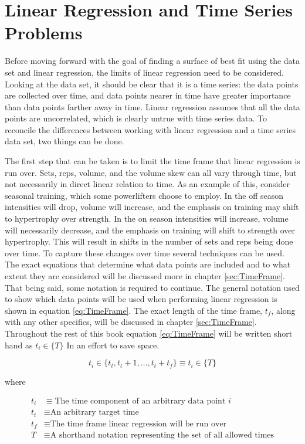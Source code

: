 \section{Linear Regression and Time Series Problems}
\label{sec:PotentialSurfaceLinearRegressionAndTimeSeriesProblems}

Before moving forward with the goal of finding a surface of best fit using the data set and linear regression, the limits of linear regression need to be considered. Looking at the data set, it should be clear that it is a time series: the data points are collected over time, and data points nearer in time have greater importance than data points farther away in time. Linear regression assumes that all the data points are uncorrelated, which is clearly untrue with time series data. To reconcile the differences between working with linear regression and a time series data set, two things can be done.

The first step that can be taken is to limit the time frame that linear regression is run over. Sets, reps, volume, and the volume skew can all vary through time, but not necessarily in direct linear relation to time. As an example of this, consider seasonal training, which some powerlifters choose to employ. In the off season intensities will drop, volume will increase, and the emphasis on training may shift to hypertrophy over strength. In the on season intensities will increase, volume will necessarily decrease, and the emphasis on training will shift to strength over hypertrophy. This will result in shifts in the number of sets and reps being done over time. To capture these changes over time several techniques can be used. The exact equations that determine what data points are included and to what extent they are considered will be discussed more in chapter \ref{sec:TimeFrame}. That being said, some notation is required to continue. The general notation used to show which data points will be used when performing linear regression is shown in equation \ref{eq:TimeFrame}. The exact length of the time frame, $t_f$, along with any other specifics, will be discussed in chapter \ref{sec:TimeFrame}. Throughout the rest of this book equation \ref{eq:TimeFrame} will be written short hand as $t_i\in \{ T \}$ In an effort to save space.

\begin{equation}
    \label{eq:TimeFrame}
    t_i \in\{ t_t, t_t+1,\dots,t_t+t_f \}
    \equiv t_i \in \{ T \}
\end{equation}
\centerline{where}
\begin{equation*}
    \begin{split}
        t_i &\equiv \text{The time component of an arbitrary data point }i \\
        t_t &\equiv \text{An arbitrary target time} \\
        t_f &\equiv \text{The time frame linear regression will be run over} \\
        T & \equiv \text{A shorthand notation representing the set of all allowed times}
    \end{split}
\end{equation*}

